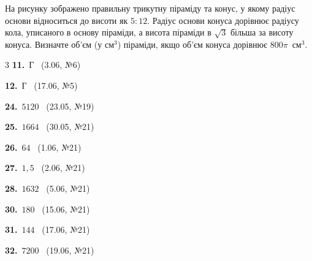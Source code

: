 \documentclass[12pt]{article}
\begin{document}
\begin{samepage}
\noindent
\begin{minipage}[c]{0.56\textwidth}
\zadnum На рисунку зображено правильну трикутну піраміду та конус, у якому радіус основи відноситься до висоти як $5 : 12$. Радіус основи конуса дорівнює радіусу кола, уписаного в основу піраміди, а висота піраміди в $\sqrt{3}$ більша за висоту конуса. Визначте об'єм (у см$^3$) піраміди, якщо об'єм конуса дорівнює $800\pi$~см$^3$. 
\end{minipage}%
\hfill
\begin{minipage}[c]{0.40\textwidth}
\centering
\begin{nmtfit}\end{nmtfit}
\end{minipage}
\par\nbvspace{0.2cm}
\nmtAnswerBox
\par{}
\end{samepage}

\ifshowsolutions
{}
\begin{multicols}{3}\noindent
\noindent\textbf{11.}~Г \ {\scriptsize\color{gray}(3.06, №6)}\par
\noindent\textbf{12.}~Г \ {\scriptsize\color{gray}(17.06, №5)}\par
\noindent\textbf{24.}~$5120$ \ {\scriptsize\color{gray}(23.05, №19)}\par
\noindent\textbf{25.}~$1664$ \ {\scriptsize\color{gray}(30.05, №21)}\par
\noindent\textbf{26.}~$64$ \ {\scriptsize\color{gray}(1.06, №21)}\par
\noindent\textbf{27.}~$1{,}5$ \ {\scriptsize\color{gray}(2.06, №21)}\par
\noindent\textbf{28.}~$1632$ \ {\scriptsize\color{gray}(5.06, №21)}\par
\noindent\textbf{30.}~$180$ \ {\scriptsize\color{gray}(15.06, №21)}\par
\noindent\textbf{31.}~$144$ \ {\scriptsize\color{gray}(17.06, №21)}\par
\noindent\textbf{32.}~$7200$ \ {\scriptsize\color{gray}(19.06, №21)}\par
\end{multicols}
\fi

\endgroup
\end{document}
